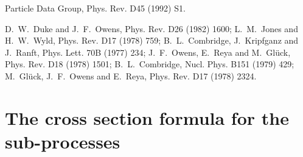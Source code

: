 \begin{thebibliography}{99}
%
Particle Data Group, 
{\elevenit Phys. Rev.} {\elevenbf D45} (1992) S1.

%
%
D.~W.~Duke and J.~F.~Owens,
{\elevenit Phys. Rev.} {\elevenbf D26} (1982) 1600;
%
L.~M.~Jones and H.~W.~Wyld,
{\elevenit Phys. Rev.} {\elevenbf D17} (1978) 759;
%
B.~L.~Combridge, J.~Kripfganz and J.~Ranft,
{\elevenit Phys. Lett.} {\elevenbf 70B} (1977) 234;
J.~F.~Owens, E.~Reya and M.~Gl\"{u}ck,
{\elevenit Phys. Rev.} {\elevenbf D18} (1978) 1501;
%
B.~L.~Combridge,
{\elevenit Nucl. Phys.} {\elevenbf B151} (1979) 429;
M.~Gl\"{u}ck, J.~F.~Owens and E.~Reya,
{\elevenit Phys. Rev.} {\elevenbf D17} (1978) 2324.




%
%
%
%
%


\end{thebibliography}

%
%
%

\appendix



\section{The cross section formula for the sub-processes}

